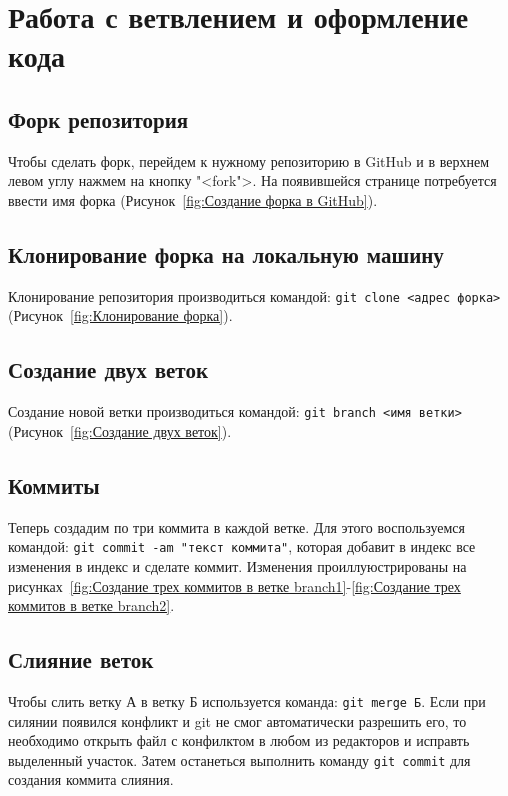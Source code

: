 \chapter{Работа с ветвлением и оформление кода}

\section{Форк репозитория}

Чтобы сделать форк, перейдем к нужному репозиторию в GitHub и в верхнем левом
углу нажмем на кнопку "<fork">.
На появившейся странице потребуется
ввести имя форка (Рисунок~\ref{fig:Создание форка в GitHub}).

\section{Клонирование форка на локальную машину}

Клонирование репозитория производиться командой:
\texttt{git~clone~<адрес~форка>} (Рисунок~\ref{fig:Клонирование форка}).

\section{Создание двух веток}

Создание новой ветки производиться командой:
\texttt{git~branch~<имя~ветки>} (Рисунок~\ref{fig:Создание двух веток}).

\section{Коммиты}
Теперь создадим по три коммита в каждой ветке.
Для этого воспользуемся
командой: \texttt{git commit -am "текст коммита"}, которая добавит в индекс
все изменения в индекс и сделате коммит.
Изменения проиллуюстрированы
на рисунках~\ref{fig:Создание трех коммитов в ветке branch1}-\ref{fig:Создание трех коммитов в ветке branch2}.


\section{Слияние веток}
\label{3:lb:git:merge:conflict}
Чтобы слить ветку А в ветку Б используется команда: \texttt{git merge Б}.
Если при силянии появился конфликт и git не смог автоматически разрешить его,
то необходимо открыть файл с конфилктом в любом из редакторов и исправть
выделенный участок. Затем останеться выполнить команду \texttt{git commit}
для создания коммита слияния.

